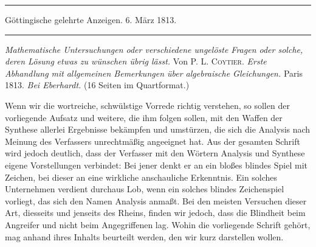 \clearpage
{}
\begin{center}
\par\noindent\hfill\rule{0.30\linewidth}{0.4pt}\hfill\mbox{}\par
Göttingische gelehrte Anzeigen. 6. März 1813.
\par\noindent\hfill\rule{0.30\linewidth}{0.4pt}\hfill\mbox{}\par
\end{center}

\textit{Mathematische Untersuchungen oder verschiedene ungelöste Fragen oder solche, deren Lösung} \textit{etwas zu wünschen übrig lässt.} Von P. L. \textsc{Coytier.} \textit{Erste Abhandlung mit} \textit{allgemeinen Bemerkungen über algebraische Gleichungen.} Paris 1813. \textit{Bei Eberhardt.} (16 Seiten im Quartformat.)\par

Wenn wir die wortreiche, schwülstige Vorrede richtig verstehen, so sollen der vorliegende Aufsatz und weitere, die ihm folgen sollen, mit den Waffen der Synthese allerlei Ergebnisse bekämpfen und umstürzen, die sich die Analysis nach Meinung des Verfassers unrechtmäßig angeeignet hat. Aus der gesamten Schrift wird jedoch deutlich, dass der Verfasser mit den Wörtern Analysis und Synthese eigene Vorstellungen verbindet: Bei jener denkt er an ein bloßes blindes Spiel mit Zeichen, bei dieser an eine wirkliche anschauliche Erkenntnis. Ein solches Unternehmen verdient durchaus Lob, wenn ein solches blindes Zeichenspiel vorliegt, das sich den Namen Analysis anmaßt. Bei den meisten Versuchen dieser Art, diesseits und jenseits des Rheins, finden wir jedoch, dass die Blindheit beim Angreifer und nicht beim Angegriffenen lag. Wohin die vorliegende Schrift gehört, mag anhand ihres Inhalts beurteilt werden, den wir kurz darstellen wollen.\par

